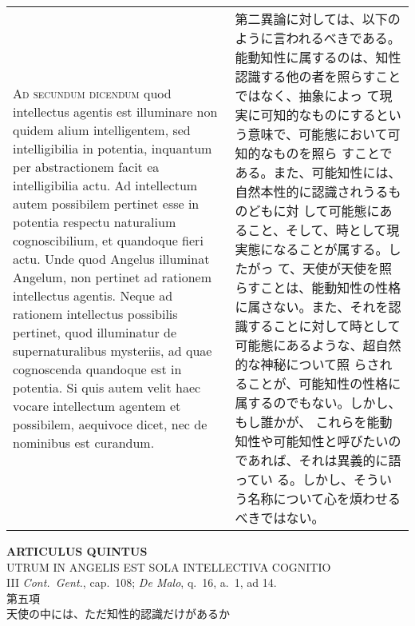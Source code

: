 \documentclass[10pt]{jsarticle} %
\begin{document}
\begin{longtable}{p{21em}p{21em}}
\\


{\scshape Ad secundum dicendum} quod intellectus
agentis est illuminare non quidem alium intelligentem, sed
intelligibilia in potentia, inquantum per abstractionem facit ea
intelligibilia actu. Ad intellectum autem possibilem pertinet esse in
potentia respectu naturalium cognoscibilium, et quandoque fieri
actu. Unde quod Angelus illuminat Angelum, non pertinet ad rationem
intellectus agentis. Neque ad rationem intellectus possibilis pertinet,
quod illuminatur de supernaturalibus mysteriis, ad quae cognoscenda
quandoque est in potentia. Si quis autem velit haec vocare intellectum
agentem et possibilem, aequivoce dicet, nec de nominibus est curandum.


&

第二異論に対しては、以下のように言われるべきである。
能動知性に属するのは、知性認識する他の者を照らすことではなく、抽象によっ
 て現実に可知的なものにするという意味で、可能態において可知的なものを照ら
 すことである。また、可能知性には、自然本性的に認識されうるものどもに対
 して可能態にあること、そして、時として現実態になることが属する。したがっ
 て、天使が天使を照らすことは、能動知性の性格に属さない。また、それを認
 識することに対して時として可能態にあるような、超自然的な神秘について照
 らされることが、可能知性の性格に属するのでもない。しかし、もし誰かが、
 これらを能動知性や可能知性と呼びたいのであれば、それは異義的に語ってい
 る。しかし、そういう名称について心を煩わせるべきではない。

\end{longtable}
\newpage



\begin{center}
 {\Large {\bf ARTICULUS QUINTUS}}\\
 {\large UTRUM IN ANGELIS EST SOLA INTELLECTIVA COGNITIO}\\
 {\footnotesize III {\itshape Cont.~Gent.}, cap.~108; {\itshape De
 Malo}, q.~16, a.~1, ad 14.}\\
 {\Large 第五項\\天使の中には、ただ知性的認識だけがあるか}
\end{center}
\end{document}
